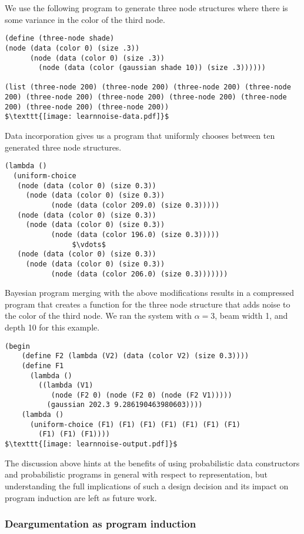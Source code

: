 \documentclass[a4paper,10pt]{article}
\begin{document}
We use the following program to generate three node structures where there is some variance in the color of the third node.
\begin{lstlisting}[mathescape=true]
(define (three-node shade)
(node (data (color 0) (size .3))
      (node (data (color 0) (size .3)) 
	    (node (data (color (gaussian shade 10)) (size .3))))))

(list (three-node 200) (three-node 200) (three-node 200) (three-node 200) (three-node 200) (three-node 200) (three-node 200) (three-node 200) (three-node 200) (three-node 200))
$\texttt{[image: learnnoise-data.pdf]}$
\end{lstlisting}
Data incorporation gives us a program that uniformly chooses between ten generated three node structures.
\begin{lstlisting}[mathescape=true]
(lambda ()
  (uniform-choice
   (node (data (color 0) (size 0.3))
	 (node (data (color 0) (size 0.3))
	       (node (data (color 209.0) (size 0.3)))))
   (node (data (color 0) (size 0.3))
	 (node (data (color 0) (size 0.3))
	       (node (data (color 196.0) (size 0.3)))))
                $\vdots$
   (node (data (color 0) (size 0.3))
	 (node (data (color 0) (size 0.3))
	       (node (data (color 206.0) (size 0.3)))))))
\end{lstlisting}
Bayesian program merging with the above modifications results in a compressed program that creates a function for the three node structure that adds noise to the color of the third node.  We ran the system with $\alpha=3$, beam width 1, and depth 10 for this example.
\begin{lstlisting}[mathescape=true]
(begin
    (define F2 (lambda (V2) (data (color V2) (size 0.3))))
    (define F1
      (lambda ()
        ((lambda (V1)
           (node (F2 0) (node (F2 0) (node (F2 V1)))))
          (gaussian 202.3 9.286190463980603))))
    (lambda ()
      (uniform-choice (F1) (F1) (F1) (F1) (F1) (F1) (F1)
        (F1) (F1) (F1))))
$\texttt{[image: learnnoise-output.pdf]}$
\end{lstlisting}

The discussion above hints at the benefits of using probabilistic data constructors and probabilistic programs in general with respect to representation, but understanding the full implications of such a design decision and its impact on program induction are left as future work.


\subsubsection{Deargumentation as program induction}
\end{document}
